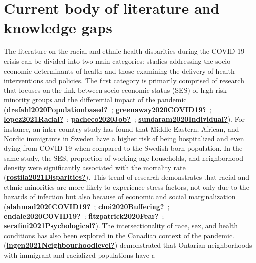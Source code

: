 \documentclass[
]{article}
\begin{document}
\newpage

\hypertarget{current-body-of-literature-and-knowledge-gaps}{%
\section{Current body of literature and knowledge gaps}\label{current-body-of-literature-and-knowledge-gaps}}

The literature on the racial and ethnic health disparities during the COVID-19
crisis can be divided into two main categories: studies addressing the
socio-economic determinants of health and those examining the delivery of health
interventions and policies. The first category is primarily comprised of
research that focuses on the link between socio-economic status (SES) of
high-risk minority groups and the differential impact of the pandemic
(\protect\hyperlink{ref-drefahl2020Populationbased}{\textbf{drefahl2020Populationbased?}}~; \protect\hyperlink{ref-greenaway2020COVID19}{\textbf{greenaway2020COVID19?}}~; \protect\hyperlink{ref-lopez2021Racial}{\textbf{lopez2021Racial?}}~; \protect\hyperlink{ref-pacheco2020Job}{\textbf{pacheco2020Job?}}~; \protect\hyperlink{ref-sundaram2020Individual}{\textbf{sundaram2020Individual?}}). For instance, an inter-country study
has found that Middle Eastern, African, and Nordic immigrants in Sweden have a
higher risk of being hospitalized and even dying from COVID-19 when compared to
the Swedish born population. In the same study, the SES, proportion of
working-age households, and neighborhood density were significantly associated
with the mortality rate (\protect\hyperlink{ref-rostila2021Disparities}{\textbf{rostila2021Disparities?}}). This trend of research
demonstrates that racial and ethnic minorities are more likely to experience
stress factors, not only due to the hazards of infection but also because of
economic and social marginalization (\protect\hyperlink{ref-alahmad2020COVID19}{\textbf{alahmad2020COVID19?}}~; \protect\hyperlink{ref-choi2020Buffering}{\textbf{choi2020Buffering?}}~; \protect\hyperlink{ref-endale2020COVID19}{\textbf{endale2020COVID19?}}~; \protect\hyperlink{ref-fitzpatrick2020Fear}{\textbf{fitzpatrick2020Fear?}}~; \protect\hyperlink{ref-serafini2021Psychological}{\textbf{serafini2021Psychological?}}). The
intersectionality of race, sex, and health conditions has also been explored in
the Canadian context of the pandemic. (\protect\hyperlink{ref-ingen2021Neighbourhoodlevel}{\textbf{ingen2021Neighbourhoodlevel?}}) demonstrated
that Ontarian neighborhoods with immigrant and racialized populations have a
\end{document}
